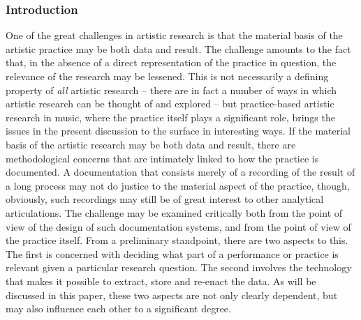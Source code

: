 \hypertarget{introduction}{%
\subsubsection{Introduction}\label{introduction}}

One of the great challenges in artistic research is that the material
basis of the artistic practice may be both data and result. The
challenge amounts to the fact that, in the absence of a direct
representation of the practice in question, the relevance of the
research may be lessened. This is not necessarily a defining property of
\emph{all} artistic research -- there are in fact a number of ways in
which artistic research can be thought of and explored -- but
practice-based artistic research in music, where the practice itself
plays a significant role, brings the issues in the present discussion to
the surface in interesting ways. If the material basis of the artistic
research may be both data and result, there are methodological concerns
that are intimately linked to how the practice is documented. A
documentation that consists merely of a recording of the result of a
long process may not do justice to the material aspect of the practice,
though, obviously, such recordings may still be of great interest to
other analytical articulations. The challenge may be examined critically
both from the point of view of the design of such documentation systems,
and from the point of view of the practice itself. From a preliminary
standpoint, there are two aspects to this. The first is concerned with
deciding what part of a performance or practice is relevant given a
particular research question. The second involves the technology that
makes it possible to extract, store and re-enact the data. As will be
discussed in this paper, these two aspects are not only clearly
dependent, but may also influence each other to a significant degree.

